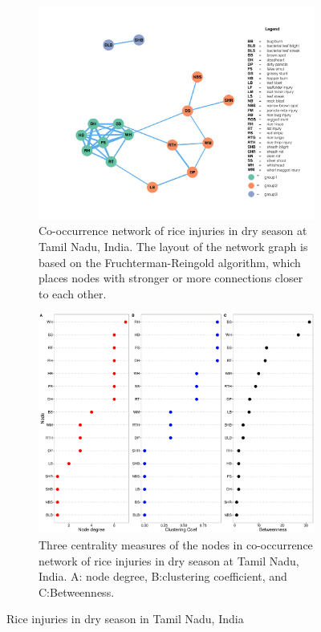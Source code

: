 \begin{figure}
    \centering
    \begin{subfigure}[b]{1\textwidth}
        \includegraphics[width = 1\textwidth]{figures/networkTM_ds/networkTM_ds.pdf}
        \caption{Co-occurrence network of rice injuries in dry season at Tamil Nadu, India. The layout of the network graph is based on the Fruchterman-Reingold algorithm, which places nodes with stronger or more connections closer to each other.}
        \label{fig:networkTM_ds}
    \end{subfigure}
    \begin{subfigure}[b]{1\textwidth}
        \includegraphics[width = 1\textwidth]{figures/nodepropTM_ds/nodepropTM_ds.pdf}
        \caption{Three centrality measures of the nodes in co-occurrence network of rice injuries in dry season at Tamil Nadu, India. A: node degree, B:clustering coefficient, and C:Betweenness.}
        \label{fig:nodepropTM_ds}
    \end{subfigure}
    \caption{Rice injuries in dry season in Tamil Nadu, India}
    \label{fig:TM_ds}
\end{figure}

